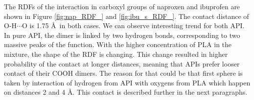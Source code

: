 The RDFs of the interaction in carboxyl groups of naproxen and ibuprofen are shown in Figure \ref{fig:nap_RDF_} and \ref{fig:ibu_s_RDF_}. The contact distance of O-H$\cdots$O is 1.75 \AA~in both cases. We can observe interesting trend for both API. In pure API, the dimer is linked by two hydrogen bonds, corresponding to two massive peaks of the function. With the higher concentration of PLA in the mixture, the shape of the RDF is changing. This change resulted in higher probability of the contact at longer distances, meaning that APIs prefer looser contact of their COOH dimers. The reason for that could be that first sphere is taken by interaction of hydrogen from API with oxygens from PLA which happen on distances 2 and 4 \AA. This contact is described further in the next paragraphs. 


\newpage
\begin{figure}[H]
	\centering
	\\

\end{figure}
